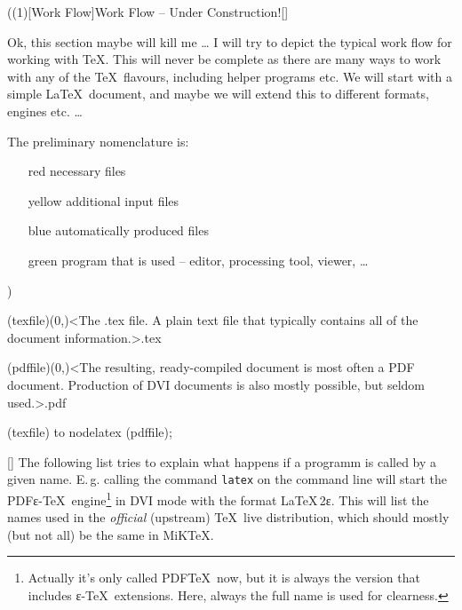 \tograph(\tostruct(1)[Work Flow]{Work Flow – Under Construction!}[\vip]
{
\flushleft
\large Ok, this section maybe will kill me … I will try to depict the typical work flow for working with \TeX. This will never be complete as there are many ways to work with any of the \TeX\ flavours, including helper programs etc. We will start with a simple \LaTeX\ document, and maybe we will extend this to different formats, engines etc. …

The preliminary nomenclature is:
\begin{itemize}
\item[red] necessary files
\item[yellow] additional input files
\item[blue] automatically produced files
\item[green] program that is used – editor, processing tool, viewer, …
\end{itemize}

\let\necessary\vip
\let\additional\experimental
\let\automatic\normalimportant
\let\program\package
}
){
	\tonode(texfile)(0,\layer)<The .tex file. A plain text file that typically contains all of the document information.>{.tex}
	\steplayer[-5]

	\tonode(pdffile)(0,\layer)<The resulting, ready-compiled document is most often a PDF document. Production of DVI documents is also mostly possible, but seldom used.>{.pdf}

	(texfile) to node{latex} (pdffile);
}

\label{sec:text}

\large
{}

\settextviews  %
\onecolumn

[\normalimportant]
\flushleft  %
The following list tries to explain what happens if a programm is called by a given name. E.\,g. calling the command \texttt{latex} on the command line will start the PDFε-\TeX\ engine\footnote{Actually it's only called PDF\TeX\ now, but it is always the version that includes ε-\TeX\ extensions. Here, always the full name is used for clearness.} in DVI mode with the format \LaTeX\,2\raisebox{-.5ex}ε. This will list the names used in the \emph{official} (upstream) \TeX~live distribution, which should mostly (but not all) be the same in MiK\TeX.


